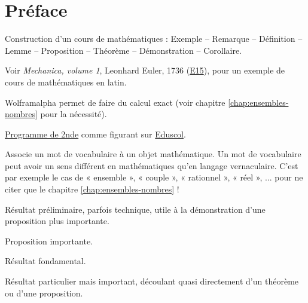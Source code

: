 
\chapter*{Préface}

Construction d'un cours de mathématiques : Exemple -- Remarque -- Définition -- Lemme -- Proposition -- Théorème -- Démonstration -- Corollaire.

Voir \emph{Mechanica, volume 1}, Leonhard Euler, 1736 (\href{https://scholarlycommons.pacific.edu/euler-works/15/}{E15}), pour un exemple de cours de mathématiques en latin.

Wolframalpha permet de faire du calcul exact (voir chapitre \ref{chap:ensembles-nombres} pour la nécessité).

\href{https://eduscol.education.fr/document/24553/download}{Programme de 2nde} comme figurant sur 
\href{https://eduscol.education.fr/1723/programmes-et-ressources-en-mathematiques-voie-gt}{Eduscol}.

\begin{definition*}
Associe un mot de vocabulaire à un objet mathématique.
Un mot de vocabulaire peut avoir un sens différent en mathématiques qu'en langage vernaculaire.
C'est par exemple le cas de « ensemble », « couple », « rationnel », « réel », ... pour ne citer que le chapitre \ref{chap:ensembles-nombres} !
\end{definition*}

\begin{lemme*}
	Résultat préliminaire, parfois technique, utile à la démonstration d'une proposition plus importante.
\end{lemme*}

\begin{proposition*}
	Proposition importante.
\end{proposition*}

\begin{theorem*}
	Résultat fondamental.
\end{theorem*}

\begin{corollaire*}
	Résultat particulier mais important, découlant quasi directement d'un théorème ou d'une proposition.
\end{corollaire*}

